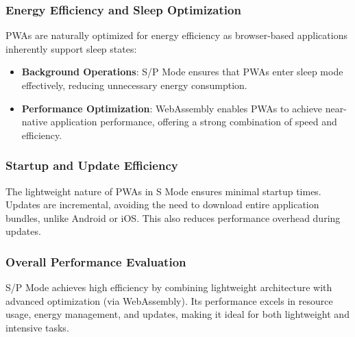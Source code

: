 \subsubsection{Energy Efficiency and Sleep Optimization}
PWAs are naturally optimized for energy efficiency as browser-based applications inherently support sleep states:
\begin{itemize}
    \item \textbf{Background Operations}: S/P Mode ensures that PWAs enter sleep mode effectively, reducing unnecessary energy consumption.
    \item \textbf{Performance Optimization}: WebAssembly enables PWAs to achieve near-native application performance, offering a strong combination of speed and efficiency.
\end{itemize}

\subsubsection{Startup and Update Efficiency}
The lightweight nature of PWAs in S Mode ensures minimal startup times. Updates are incremental, avoiding the need to download entire application bundles, unlike Android or iOS. This also reduces performance overhead during updates.

\subsubsection{Overall Performance Evaluation}
S/P Mode achieves high efficiency by combining lightweight architecture with advanced optimization (via WebAssembly). Its performance excels in resource usage, energy management, and updates, making it ideal for both lightweight and intensive tasks.


